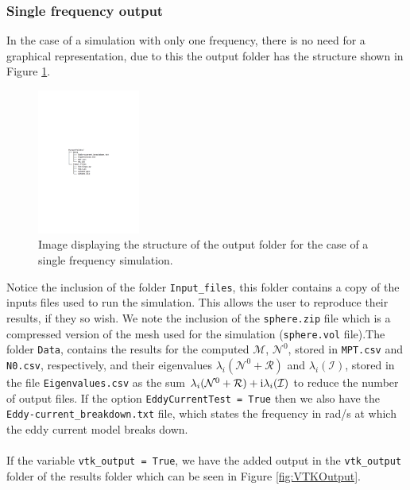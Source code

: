 \subsubsection{Single frequency output}
In the case of a simulation with only one frequency, there is no need for a graphical representation, due to this the output folder has the structure shown in Figure \ref{fig:SingleOutput}.
\begin{figure}[H]
\begin{center}
\includegraphics[width=0.3\textwidth]{Figures/SingleOutput}
\caption{Image displaying the structure of the output folder for the case of a single frequency simulation.}\label{fig:SingleOutput}
\end{center}
\end{figure}
\noindent
Notice the inclusion of the folder \texttt{Input\_files}, this folder contains a copy of the inputs files used to run the simulation. This allows the user to reproduce their results, if they so wish. We note the inclusion of the \texttt{sphere.zip} file which is a compressed version of the mesh used for the simulation (\texttt{sphere.vol} file).The folder \texttt{Data}, contains the results for the computed $\mathcal{M}$, $\mathcal{N}^0$, stored in \texttt{MPT.csv} and \texttt{N0.csv}, respectively,  and their eigenvalues $\lambda_i(\mathcal{N}^0+\mathcal{R})$ and $\lambda_i(\mathcal{I})$,  stored in the file \texttt{Eigenvalues.csv} as the sum $\lambda_i(\mathcal{N}^0+\mathcal{R})+\mathrm{i}\lambda_i(\mathcal{I})$ to reduce the number of output files. If the option \texttt{EddyCurrentTest = True} then we also have the \texttt{Eddy-current\_breakdown.txt} file, which states the frequency in rad/s at which the eddy current model breaks down.\\
\\
If the variable \texttt{vtk\_output = True}, we have the added output in the \texttt{vtk\_output} folder of the results folder which can be seen in Figure \ref{fig:VTKOutput}.
